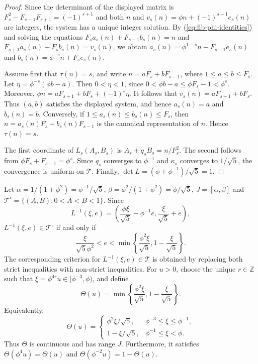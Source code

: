 \documentclass[11pt]{amsart}
\theoremstyle{definition}
\newcommand{\Tcal}{\mathcal T}
\begin{document}
\begin{proof}
Since the determinant of the displayed matrix is $F_s^2-F_{s-1}F_{s+1}=(-1)^{s+1}$ and both $n$ and $v_s(n)=\phi n+(-1)^{s+1}e_s(n)$ are integers, the system has a unique integer solution. By (\ref{eq:fib-phi-identities}) and solving the equations $F_sa_s(n)+F_{s-1}b_s(n)=n$ and $F_{s+1}a_s(n)+F_sb_s(n)=v_s(n)$, we obtain $a_s(n)=\phi^{1-s}n-F_{s-1}e_s(n)$ and $b_s(n)=\phi^{-s}n+F_se_s(n)$.

Assume first that $\tau(n)=s$, and write $n=aF_s+bF_{s-1}$, where $1\leq a\leq b\leq F_s$. Let $\eta=\phi^{-s}(\phi b-a)$. Then $0<\eta<1$, since $0<\phi b-a\leq\phi F_s-1<\phi^s$. Moreover, $\phi n=aF_{s+1}+bF_s+(-1)^s\eta$. It follows that $v_s(n)=aF_{s+1}+bF_s$. Thus $(a,b)$ satisfies the
displayed system, and hence $a_s(n)=a$ and $b_s(n)=b$. Conversely, if $1\leq a_s(n)\leq b_s(n)\leq F_s$, then $n=a_s(n)F_s+b_s(n)F_{s-1}$ is the canonical representation of $n$. Hence $\tau(n)=s$.

The first coordinate of $L_s(A_s,B_s)$ is $A_s+q_sB_s=n/F_s^2$. The second follows from $\phi F_s+F_{s-1}=\phi^s$. Since $q_s$ converges to $\phi^{-1}$
and $\kappa_s$ converges to $1/\sqrt5$, the convergence is uniform on $\Tcal$. Finally, $\det L=(\phi+\phi^{-1})/\sqrt5=1$.
\end{proof}

Let $\alpha=1/(1+\phi^2)=\phi^{-1}/\sqrt5$, $\beta=\phi^2/(1+\phi^2)=\phi/\sqrt5$, $J=[\alpha,\beta]$ and $\Tcal^\circ=\{(A,B):0<A<B<1\}$. Since
\[
L^{-1}(\xi,e)=\left(\frac{\phi\xi}{\sqrt5}-\phi^{-1}e,
\frac{\xi}{\sqrt5}+e\right),
\]
$L^{-1}(\xi,e)\in\Tcal^\circ$ if and only if
\begin{equation}\label{eq:triangle-criterion}
\frac{\xi}{\sqrt5\phi^2}<e<
\min\left\{\frac{\phi^2\xi}{\sqrt5},
1-\frac{\xi}{\sqrt5}\right\}.
\end{equation}
The corresponding criterion for $L^{-1}(\xi,e)\in\Tcal$ is obtained by
replacing both strict inequalities with non-strict inequalities.
For $u>0$, choose the unique $r\in\mathbb Z$ such that $\xi=\phi^{4r}u\in[\phi^{-3},\phi)$, and define
\begin{equation}\label{eq:Theta}
\Theta(u)=\min\left\{\frac{\phi^2\xi}{\sqrt5},
1-\frac{\xi}{\sqrt5}\right\}.
\end{equation}
Equivalently,
\[
\Theta(u)=
\begin{cases}
\phi^2\xi/\sqrt5,&\phi^{-3}\leq\xi\leq\phi^{-1},\\
1-\xi/\sqrt5,&\phi^{-1}\leq\xi<\phi.
\end{cases}
\]
Thus $\Theta$ is continuous and has range $J$. Furthermore, it satisfies
$\Theta(\phi^4u)=\Theta(u)$ and
$\Theta(\phi^{-2}u)=1-\Theta(u)$.
\end{document}
